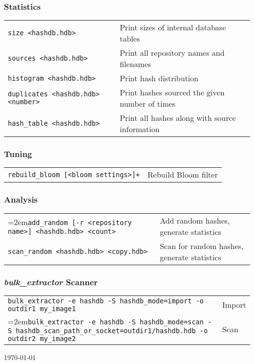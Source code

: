\documentclass[12pt]{article}
\newcommand{\bulk}{\emph{bulk\_extractor}\xspace}
\begin{document}
\subsubsection*{Statistics}
\begin{tabular}{p{8 cm} p{9 cm} }
\texttt{size <hashdb.hdb>} & Print sizes of internal database tables \\
\texttt{sources <hashdb.hdb>} & Print all repository names and filenames \\
\texttt{histogram <hashdb.hdb>} & Print hash distribution \\
\texttt{duplicates <hashdb.hdb> <number>} & Print hashes sourced the given number of times \\
\texttt{hash\_table <hashdb.hdb>} & Print all hashes along with source information\\
\end{tabular}

\subsubsection*{Tuning}
\begin{tabular}{p{8 cm} p{9 cm} }
\texttt{rebuild\_bloom [<bloom settings>]+} & Rebuild Bloom filter \\
\end{tabular}

\subsubsection*{Analysis}
\begin{tabular}{p{8 cm} p{9 cm} }
\hangindent=2em\texttt{add\_random [-r <repository name>] <hashdb.hdb> <count>} & Add random hashes, generate statistics \\
\texttt{scan\_random <hashdb.hdb> <copy.hdb>} & Scan for random hashes, generate statistics \\
\end{tabular}

\subsubsection*{\bulk Scanner}
\begin{tabular}{p{15 cm} p{4 cm} }
\texttt{bulk\_extractor -e hashdb -S hashdb\_mode=import -o outdir1 my\_image1} & Import \\
\hangindent=2em\texttt{bulk\_extractor -e hashdb -S hashdb\_mode=scan -S hashdb\_scan\_path\_or\_socket=outdir1/hashdb.hdb -o outdir2 my\_image2} & Scan \\
\end{tabular}

\vspace{2mm}
\begin{center}
\begin{footnotesize}
\today
\end{footnotesize}
\end{center}
\end{document}
